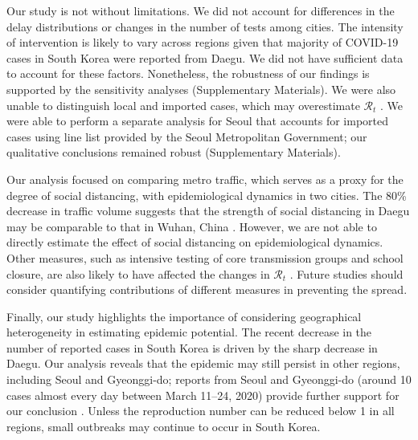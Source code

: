 \documentclass[12pt]{article}
\begin{document}
Our study is not without limitations.
We did not account for differences in the delay distributions or changes in the number of tests among cities.
The intensity of intervention is likely to vary across regions given that majority of COVID-19 cases in South Korea were reported from Daegu.
We did not have sufficient data to account for these factors.
Nonetheless, the robustness of our findings is supported by the sensitivity analyses (Supplementary Materials).
We were also unable to distinguish local and imported cases, which may overestimate $\mathcal R_t$ \citep{thompson2019improved}.
We were able to perform a separate analysis for Seoul that accounts for imported cases using line list provided by the Seoul Metropolitan Government; our qualitative conclusions remained robust (Supplementary Materials).

Our analysis focused on comparing metro traffic, which serves as a proxy for the degree of social distancing, with epidemiological dynamics in two cities.
The 80\% decrease in traffic volume suggests that the strength of social distancing in Daegu may be comparable to that in Wuhan, China \citep{lai2020effect}.
However, we are not able to directly estimate the effect of social distancing on epidemiological dynamics.
Other measures, such as intensive testing of core transmission groups and school closure, are also likely to have affected the changes in $\mathcal R_t$ \citep{kcdc}.
Future studies should consider quantifying contributions of different measures in preventing the spread.

Finally, our study highlights the importance of considering geographical heterogeneity in estimating epidemic potential.
The recent decrease in the number of reported cases in South Korea is driven by the sharp decrease in Daegu.
Our analysis reveals that the epidemic may still persist in other regions, including Seoul and Gyeonggi-do;
reports from Seoul and Gyeonggi-do (around 10 cases almost every day between March 11--24, 2020) provide further support for our conclusion \citep{kcdc}.
Unless the reproduction number can be reduced below 1 in all regions, small outbreaks may continue to occur in South Korea.

\pagebreak



\pagebreak


\end{document}
